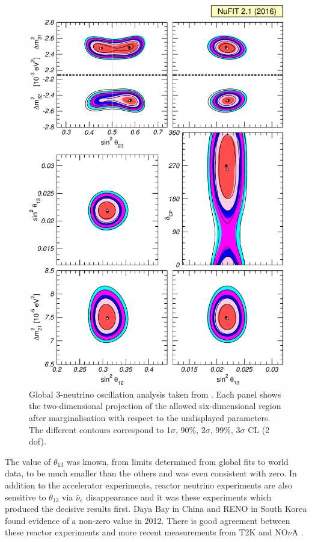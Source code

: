 \begin{figure}[p]
  \centering
  \includegraphics[width=12cm]{GlobalFit.pdf}
  \caption{Global 3-neutrino oscillation analysis taken from \cite{NuFit2014,NuFit2017}. Each panel shows the two-dimensional projection of the allowed six-dimensional region after marginalisation with respect to the undisplayed parameters. The different contours correspond to 1$\sigma$, 90\%, 2$\sigma$, 99\%, 3$\sigma$ CL (2 dof).}
  \label{fig:GlobalFit}
\end{figure}

The value of $\theta_{13}$ was known, from limits determined from global fits to world data, to be much smaller than the others and was even consistent with zero.  In addition to the accelerator experiments, reactor neutrino experiments are also sensitive to $\theta_{13}$ via $\bar{\nu}_e$ disappearance and it was these experiments which produced the decisive results first.  Daya Bay \cite{DayaBay2012} in China and RENO \cite{RENO2012} in South Korea found evidence of a non-zero value in 2012.  There is good agreement between these reactor experiments and more recent measurements from T2K \cite{T2Knue2014} and NO$\nu$A \cite{NOvAnue2016}.

